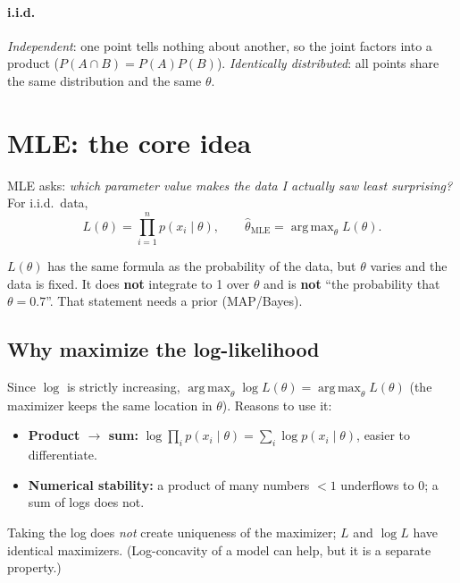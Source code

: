 \documentclass[11pt,a4paper]{article}
\DeclareMathOperator*{\argmax}{arg\,max}
\begin{document}
\paragraph{i.i.d.} \emph{Independent}: one point tells nothing about another, so the joint factors into a product ($P(A\cap B)=P(A)P(B)$). \emph{Identically distributed}: all points share the same distribution and the same $\theta$.

\section{MLE: the core idea}
MLE asks: \emph{which parameter value makes the data I actually saw least surprising?}
For i.i.d.\ data,
\[
L(\theta)=\prod_{i=1}^n p(x_i\mid\theta),\qquad
\hat\theta_{\text{MLE}}=\argmax_\theta L(\theta).
\]

\begin{keybox}
$L(\theta)$ has the same formula as the probability of the data, but $\theta$ varies and the data is fixed. It does \textbf{not} integrate to 1 over $\theta$ and is \textbf{not} ``the probability that $\theta=0.7$''. That statement needs a prior (MAP/Bayes).
\end{keybox}

\subsection{Why maximize the log-likelihood}
Since $\log$ is strictly increasing, $\argmax_\theta \log L(\theta)=\argmax_\theta L(\theta)$ (the maximizer keeps the same location in $\theta$). Reasons to use it:
\begin{itemize}[nosep]
  \item \textbf{Product $\to$ sum:} $\log\prod_i p(x_i\mid\theta)=\sum_i\log p(x_i\mid\theta)$, easier to differentiate.
  \item \textbf{Numerical stability:} a product of many numbers $<1$ underflows to $0$; a sum of logs does not.
\end{itemize}

\begin{pitfall}
Taking the log does \emph{not} create uniqueness of the maximizer; $L$ and $\log L$ have identical maximizers. (Log-concavity of a model can help, but it is a separate property.)
\end{pitfall}
\end{document}

